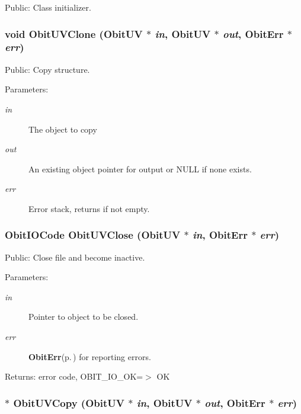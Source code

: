 Public: Class initializer. 

\subsubsection{\setlength{\rightskip}{0pt plus 5cm}void Obit\-UVClone ({\bf Obit\-UV} $\ast$ {\em in}, {\bf Obit\-UV} $\ast$ {\em out}, {\bf Obit\-Err} $\ast$ {\em err})}\label{ObitUV_8h_a32}


Public: Copy structure. 

\begin{Desc}
\item[Parameters:]
\begin{description}
\item[{\em in}]The object to copy \item[{\em out}]An existing object pointer for output or NULL if none exists. \item[{\em err}]Error stack, returns if not empty. \end{description}
\end{Desc}
\subsubsection{\setlength{\rightskip}{0pt plus 5cm}Obit\-IOCode Obit\-UVClose ({\bf Obit\-UV} $\ast$ {\em in}, {\bf Obit\-Err} $\ast$ {\em err})}\label{ObitUV_8h_a35}


Public: Close file and become inactive. 

\begin{Desc}
\item[Parameters:]
\begin{description}
\item[{\em in}]Pointer to object to be closed. \item[{\em err}]{\bf Obit\-Err}{\rm (p.\,\pageref{structObitErr})} for reporting errors. \end{description}
\end{Desc}
\begin{Desc}
\item[Returns:]error code, OBIT\_\-IO\_\-OK=$>$ OK \end{Desc}
\subsubsection{$\ast$ Obit\-UVCopy ({\bf Obit\-UV} $\ast$ {\em in}, {\bf Obit\-UV} $\ast$ {\em out}, {\bf Obit\-Err} $\ast$ {\em err})}\label{ObitUV_8h_a31}


